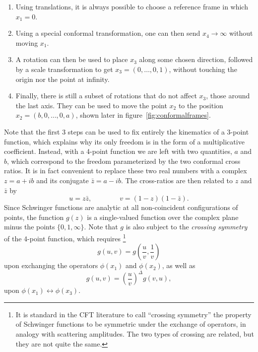 \documentclass[a4paper,12pt]{article}
\numberwithin{equation}{section}
\begin{document}
\begin{enumerate}

\item
Using translations, it is always possible to choose a reference frame in which $x_1 = 0$.

\item
Using a special conformal transformation, one can then send $x_4 \to \infty$ without moving $x_1$.

\item
A rotation can then be used to place $x_3$ along some chosen direction, followed by a scale transformation to get $x_3 = (0, \ldots, 0, 1)$, without touching the origin nor the point at infinity.

\item
Finally, there is still a subset of rotations that do not affect $x_3$, those around the last axis. They can be used to move the point $x_2$ to the position $x_2 = (b, 0, \ldots, 0, a)$, shown later in figure~\ref{fig:conformalframes}.

\end{enumerate}
%
Note that the first 3 steps can be used to fix entirely the kinematics of a 3-point function, which explains why its only freedom is in the form of a multiplicative coefficient. Instead, with a 4-point function we are left with two quantities, $a$ and $b$, which correspond to the freedom parameterized by the two conformal cross ratios.
It is in fact convenient to replace these two real numbers with a complex $z = a + i b$ and its conjugate $\bar{z} = a - i b$.
The cross-ratios are then related to $z$ and $\bar{z}$ by
\begin{equation}
	u = z \bar{z},
	\qquad\qquad
	v = (1 - z) (1 - \bar{z}).
\end{equation}
Since Schwinger functions are analytic at all non-coincident configurations of points, the function $g(z)$ is a single-valued function over the complex plane minus the points $\{ 0, 1, \infty \}$. Note that $g$ is also subject to the \emph{crossing symmetry} of the 4-point function, which requires%
%
\footnote{It is standard in the CFT literature to call ``crossing symmetry'' the property of Schwinger functions to be symmetric under the exchange of operators, in analogy with scattering amplitudes. The two types of crossing are related, but they are not quite the same.}
%
\begin{equation}
	g(u, v) =
	g\left( \frac{u}{v}, \frac{1}{v} \right)
\end{equation}
upon exchanging the operators $\phi(x_1)$ and $\phi(x_2)$, as well as
\begin{equation}
	g(u,v) = \left( \frac{u}{v} \right)^\Delta g(v, u),
\end{equation}
upon $\phi(x_1) \leftrightarrow \phi(x_3)$.
\end{document}
